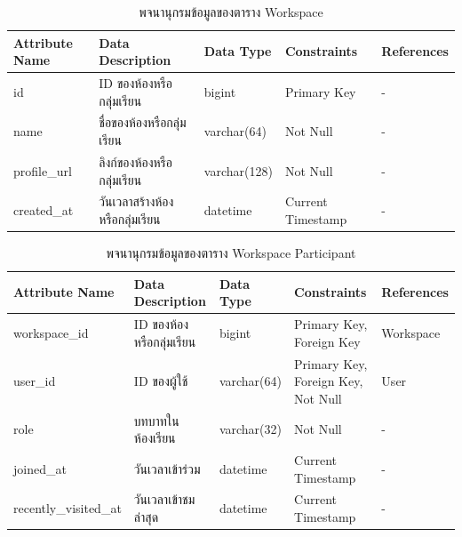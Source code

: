\documentclass[12pt,oneside,openright,a4paper]{cpe-thai-project}
\begin{document}
    \begin{table}[!h]
        \centering
        \caption{พจนานุกรมข้อมูลของตาราง Workspace}\label{tbl:data-dict-workspace}
        \begin{tabular}{p{2cm}|p{4cm}p{2cm}p{3cm}p{2cm}} \hline\hline
            Attribute Name & Data Description & Data Type & Constraints & References \\ \hline\hline
            id & ID ของห้องหรือกลุ่มเรียน & bigint & Primary Key & - \\
            name & ชื่อของห้องหรือกลุ่มเรียน & varchar(64) & Not Null & - \\
            profile\_url & ลิงก์ของห้องหรือกลุ่มเรียน & varchar(128) & Not Null & - \\
            created\_at & วันเวลาสร้างห้องหรือกลุ่มเรียน & datetime & Current Timestamp & - \\ \hline\hline
        \end{tabular}   
    \end{table}

    \begin{table}[!h]
        \centering
        \caption{พจนานุกรมข้อมูลของตาราง Workspace Participant}
        \label{tbl:data-dict-workspace_participants}
        \begin{tabular}{p{2.5cm}|p{3.5cm}p{2cm}p{3cm}p{2cm}} \hline\hline
            Attribute Name & Data Description & Data Type & Constraints & References \\ \hline\hline
            workspace\_id & ID ของห้องหรือกลุ่มเรียน & bigint & Primary Key, Foreign Key & Workspace \\
            user\_id & ID ของผู้ใช้ & varchar(64) & Primary Key, Foreign Key, Not Null & User \\
            role & บทบาทในห้องเรียน & varchar(32) & Not Null & - \\
            joined\_at & วันเวลาเข้าร่วม & datetime & Current Timestamp & - \\
            recently\_visited\_at & วันเวลาเข้าชมล่าสุด & datetime & Current Timestamp & - \\ \hline\hline
        \end{tabular}   
    \end{table}
\end{document}
